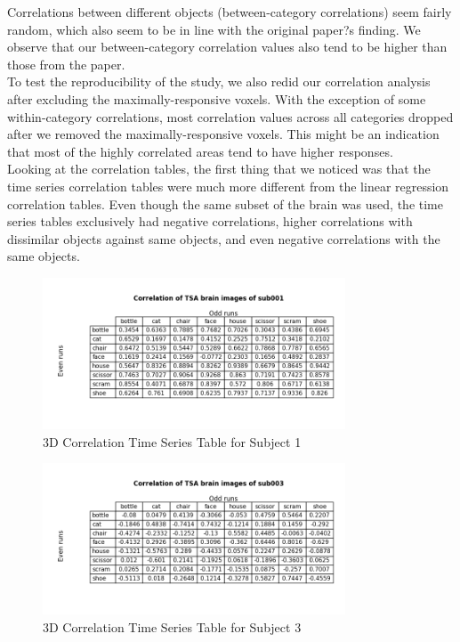 \documentclass[11pt,twocolumn]{article}
\begin{document}
Correlations between different objects (between-category correlations) seem 
fairly random, which also seem to be in line with the original paper?s finding. 
We observe that our between-category correlation values also tend to be higher 
than those from the paper. \\

To test the reproducibility of the study, we also redid our correlation 
analysis after excluding the maximally-responsive voxels. With the exception of 
some within-category correlations, most correlation values across all 
categories dropped after we removed the maximally-responsive voxels. This might 
be an indication that most of the highly correlated areas tend to have higher 
responses. \\

Looking at the correlation tables, the first thing that we noticed was that
the time series correlation tables were much more different from the linear
regression correlation tables. Even though the same subset of the brain was 
used, the time series tables exclusively had negative correlations, higher 
correlations with dissimilar objects against same objects, and even negative
correlations with the same objects. \\

\begin{figure}[h!]                                                              
\centering                                                                      
\includegraphics[width=90mm]{subtracted_correlation_table_sub001.png}                   
\caption{3D Correlation Time Series Table for Subject 1}                                    
\end{figure}

\begin{figure}[h!]                                                              
\centering                                                                      
\includegraphics[width=90mm]{subtracted_correlation_table_sub003.png}                   
\caption{3D Correlation Time Series Table for Subject 3}                                    
\end{figure}
\end{document}
